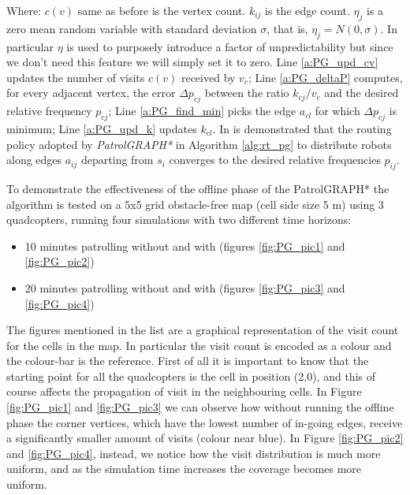 Where: $c(v)$ same as before is the vertex count. $k_{ij}$ is the edge count. $\eta_j$ is a zero mean random variable with standard deviation $\sigma$, that is, $\eta_j=N(0,\sigma)$. In particular $\eta$ is used to purposely introduce a factor of unpredictability but since we don't need this feature we will simply set it to zero. Line \ref{a:PG_upd_cv} updates the number of visits $c(v)$ received by $v_c$; Line \ref{a:PG_deltaP} computes, for every adjacent vertex, the error $\Delta p_{cj}$ between the ratio $k_{cj}/v_c$ and the desired relative frequency $p_{cj}$; Line \ref{a:PG_find_min} picks the edge $a_{cl}$ for which $\Delta p_{cj}$ is minimum; Line \ref{a:PG_upd_k} updates $k_{cl}$. 
In \cite{5711675} is demonstrated that the routing policy adopted by \textit{PatrolGRAPH*} in Algorithm \ref{alg:rt_pg} to distribute robots along edges $a_{ij}$ departing from $s_i$ converges to the desired relative frequencies $p_{ij}$.

To demonstrate the effectiveness of the offline phase of the PatrolGRAPH* the algorithm is tested on a 5x5 grid obstacle-free map (cell side size 5 m) using 3 quadcopters, running four simulations with two different time horizons: 

\begin{itemize}
\item 10 minutes patrolling without and with (figures \ref{fig:PG_pic1} and \ref{fig:PG_pic2})
\item 20 minutes patrolling without and with (figures \ref{fig:PG_pic3} and \ref{fig:PG_pic4})
\end{itemize}

The figures mentioned in the list are a graphical representation of the visit count for the cells in the map. In particular the visit count is encoded as a colour and the colour-bar is the reference. First of all it is important to know that the starting point for all the quadcopters is the cell in position (2,0), and this of course affects the propagation of visit in the neighbouring cells. In Figure \ref{fig:PG_pic1} and \ref{fig:PG_pic3} we can observe how without running the offline phase the corner vertices, which have the lowest number of in-going edges, receive a significantly smaller amount of visits (colour near blue).  In Figure \ref{fig:PG_pic2} and \ref{fig:PG_pic4}, instead, we notice how the visit distribution is much more uniform, and as the simulation time increases the coverage becomes more uniform.
